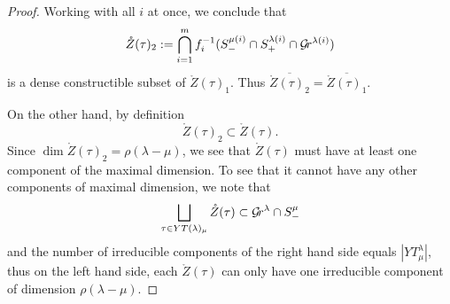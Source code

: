 \documentclass{article} %
\begin{document}
\begin{proof}
Working with all $ i $ at once, we conclude that
$$ 
\mathring Z(\tau)_2 := \bigcap_{i=1}^m f_i^{-1}(S^{\mu(i)}_- \cap S_+^{\lambda(i)} \cap \mathcal{G}\!r^{\lambda(i)}) 
$$
is a dense constructible subset of $\mathring Z(\tau)_1$. 
Thus $\overline{\mathring Z(\tau)_2} = \overline{\mathring Z(\tau)_1}$.

On the other hand, by definition 
$$
\mathring Z(\tau)_2 \subset \mathring Z(\tau). %
$$
Since $ \dim \mathring Z(\tau)_2 = \rho(\lambda - \mu)$, we see that $ \mathring Z(\tau) $ must have at least one component of the maximal dimension.  To see that it cannot have any other components of maximal dimension, we note that
$$ \bigsqcup_{\tau \in YT(\lambda)_\mu} \mathring Z(\tau) \subset \mathcal{G}\!r^\lambda \cap S_-^\mu$$
and the number of irreducible components of the right hand side 
equals $|YT^\lambda_\mu|$, thus on the left hand side, each $ \mathring Z(\tau)$ can only have one irreducible component of dimension $ \rho(\lambda - \mu)$.


\end{proof}
% 

% 
% 
% 
% 
\end{document}

